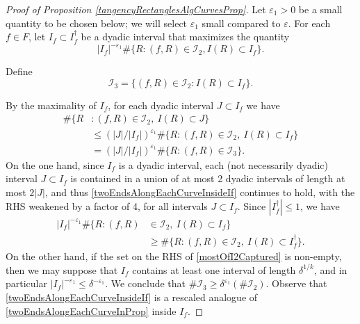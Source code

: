 \documentclass[letterpaper, reqno,11pt]{article}
\numberwithin{equation}{section}
\newcommand{\eps}{\varepsilon}
\numberwithin{thm}{section}
\theoremstyle{remark}
\begin{document}
\begin{proof}[Proof of Proposition \ref{tangencyRectanglesAlgCurvesProp}]
Let $\eps_1>0$ be a small quantity to be chosen below; we will select $\eps_1$ small compared to $\eps$. For each $f\in F$, let $I_f\subset I_f^\dag$ be a dyadic interval that maximizes the quantity 
\[
|I_f|^{-\eps_1} \#\{R \colon (f,R)\in \mathcal{I}_2, I(R) \subset I_f \}.
\]

Define 
\[
\mathcal{I}_3 = \{(f,R)\in\mathcal{I}_2\colon  I(R)\subset I_f\}.
\]

By the maximality of $I_f$, for each dyadic interval $J\subset I_f$ we have
\begin{equation}\label{twoEndsAlongEachCurveInsideIf}
\begin{split}
    \# \{R & \colon (f,R)\in \mathcal{I}_2,\  I(R)\subset J\} \\
    & \leq (|J|/|I_f|)^{\eps_1} \# \{R \colon (f,R)\in \mathcal{I}_2,\ I(R)\subset I_f\} \\
    & = (|J|/|I_f|)^{\eps_1} \# \{R\colon (f,R)\in \mathcal{I}_3\}.
\end{split}
\end{equation}
On the one hand, since $I_f$ is a dyadic interval, each (not necessarily dyadic) interval $J\subset I_f$ is contained in a union of at most 2 dyadic intervals of length at most $2|J|$, and thus \eqref{twoEndsAlongEachCurveInsideIf} continues to hold, with the RHS weakened by a factor of 4, for all intervals $J\subset I_f$.
%
Since $|I_f^\dag|\leq 1$, we have
\begin{equation}\label{mostOfI2Captured}
\begin{split}
|I_f|^{-\eps_1}  \#\{R\colon (f,R)& \in \mathcal{I}_2,\ I(R) \subset I_f \} \\
& \geq \#\{R \colon (f,R)\in \mathcal{I}_2,\ I(R) \subset I_f^\dag \}.
\end{split}
\end{equation}
On the other hand, if the set on the RHS of \eqref{mostOfI2Captured} is non-empty, then we may suppose that $I_f$ contains at least one interval of length $\delta^{1/k}$, and in particular $|I_f|^{-\eps_1}\leq \delta^{-\eps_1}$. We conclude that $\#\mathcal{I}_3\geq\delta^{\eps_1}(\#\mathcal{I}_2)$. Observe that \eqref{twoEndsAlongEachCurveInsideIf} is a rescaled analogue of \eqref{twoEndsAlongEachCurveInProp} inside $I_f$. 


\end{proof}
\end{document}
